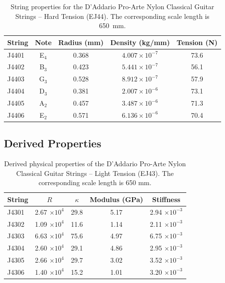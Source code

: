 \begin{table}[htbp]
  \centering
  \caption{\label{tbl:ej44_mks} String properties for the D'Addario Pro-Arte Nylon Classical Guitar Strings -- Hard Tension (EJ44). The corresponding scale length is 650~mm.}
    \begin{tabular}{lcccc}
    \hline \hline
    String  & Note  & \multicolumn{1}{l}{Radius (mm)} & \multicolumn{1}{l}{Density (kg/mm)} & \multicolumn{1}{l}{Tension (N)} \\
    \hline
    J4401 & E$_4$  & 0.368 & $4.007 \times 10^{-7}$ & 73.6 \\
    J4402 & B$_3$  & 0.423 & $5.441 \times 10^{-7}$ & 56.1 \\
    J4403 & G$_3$  & 0.528 & $8.912 \times 10^{-7}$ & 57.9 \\
    J4404 & D$_3$  & 0.381 & $2.007 \times 10^{-6}$ & 73.1 \\
    J4405 & A$_2$  & 0.457 & $3.487 \times 10^{-6}$ & 71.3 \\
    J4406 & E$_2$  & 0.571 & $6.136 \times 10^{-6}$ & 70.4 \\
    \hline
    \end{tabular}%
  \label{tab:addlabel}%
\end{table}%
 
 \subsection{Derived Properties}
\begin{table}%
  \centering
  \caption{\label{tbl:ej43_props} Derived physical properties of the D'Addario Pro-Arte Nylon Classical Guitar Strings -- Light Tension (EJ43). The corresponding scale length is 650 mm.}
    \begin{tabular}{lcccc}
    \hline \hline
    String  & $R$ & $\kappa$ & Modulus (GPa) & Stiffness \\
    \hline
    J4301 & 2.67 $\times 10^{4}$ & 29.8 & 5.17 & 2.94 $\times 10^{-3}$ \\
    J4302 & 1.09 $\times 10^{4}$ & 11.6 & 1.14 & 2.11 $\times 10^{-3}$ \\
    J4303 & 6.63 $\times 10^{4}$ & 75.6 & 4.97 & 6.75 $\times 10^{-3}$ \\
    J4304 & 2.60 $\times 10^{4}$ & 29.1 & 4.86 & 2.95 $\times 10^{-3}$ \\
    J4305 & 2.66 $\times 10^{4}$ & 29.7 & 3.02 & 3.52 $\times 10^{-3}$ \\
    J4306 & 1.40 $\times 10^{4}$ & 15.2 & 1.01 & 3.20 $\times 10^{-3}$ \\
    \hline
    \end{tabular}%
  \label{tab:addlabel}%
\end{table}%

